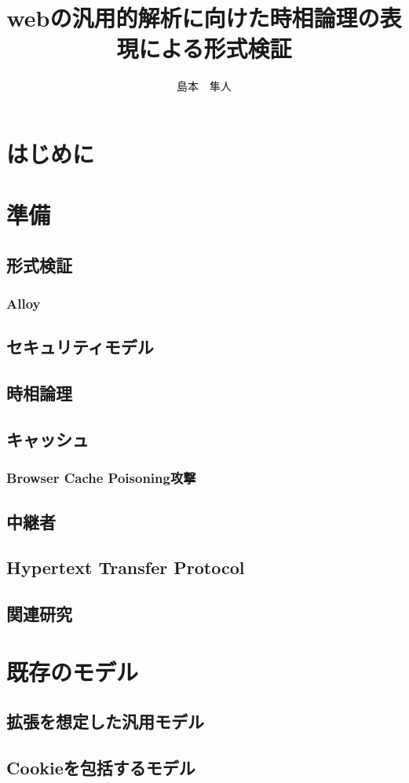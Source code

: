 \documentclass[12pt,a4paper]{jbook}
\title{webの汎用的解析に向けた時相論理の表現による形式検証}
\author{島本　隼人}
\begin{document}
\coverpage
\tableofcontents
\listoffigures
\listoftables
\body

\chapter{はじめに}

\chapter{準備}
\section{形式検証}
\subsection{Alloy}
\section{セキュリティモデル}
\section{時相論理}
\section{キャッシュ}
\subsection{Browser Cache Poisoning攻撃}
\section{中継者}
\section{Hypertext Transfer Protocol}
\section{関連研究}

\chapter{既存のモデル}
\section{拡張を想定した汎用モデル}
\section{Cookieを包括するモデル}
\end{document}
